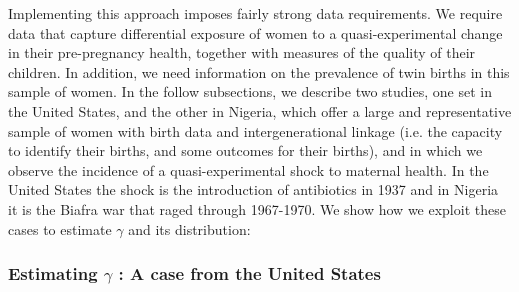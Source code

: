 \documentclass[subeqn]{article}
\begin{document}
\begin{spacing}{1.4}
Implementing this approach imposes fairly strong data requirements. We require data that capture differential exposure of women to a quasi-experimental change in their pre-pregnancy health, together with measures of the quality of their children. In addition, we need information on the prevalence of twin births in this sample of women. In the follow subsections, we describe two studies, one set in the United States, and the other in Nigeria, which offer a large and representative sample of women with birth data and intergenerational linkage (i.e. the capacity to identify their births, and some outcomes for their births), and in which we observe the incidence of a quasi-experimental shock to maternal health. In the United States the shock is the introduction of antibiotics in 1937 and in Nigeria it is the Biafra war that raged through 1967-1970. We show how we exploit these cases to estimate $\gamma$ and its distribution:\

\subsubsection{Estimating $\gamma$ : A case from the United States}
\label{sscn:USgamma}




\end{spacing}
\end{document}
